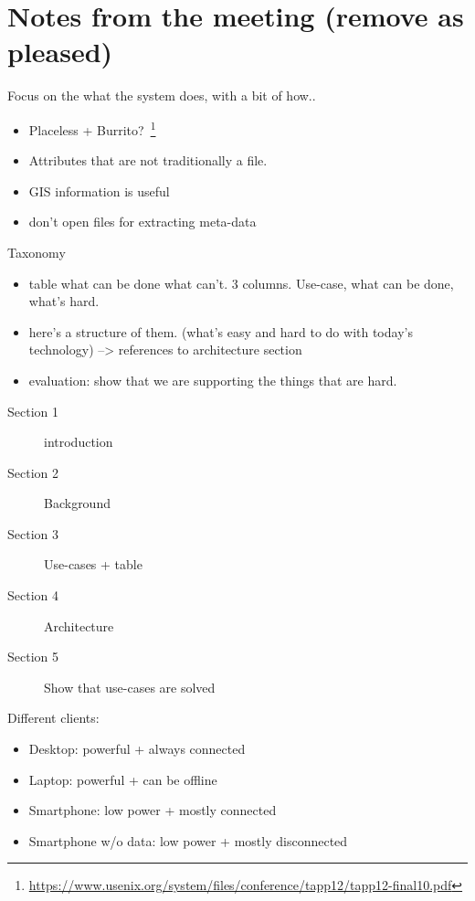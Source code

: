 \section{Notes from the meeting (remove as pleased)}

Focus on the what the system does, with a bit of how..

\begin{itemize}
    \item Placeless + Burrito?~\footnote{\url{https://www.usenix.org/system/files/conference/tapp12/tapp12-final10.pdf}}
    \item Attributes that are not traditionally a file.
    \item GIS information is useful
    \item don't open files for extracting meta-data
\end{itemize}

Taxonomy

\begin{itemize}
 \item table what can be done what can't. 3 columns. Use-case, what can be done, what's hard.
 \item here's a structure of them. (what's easy and hard to do with today's technology) --> references to architecture section
 \item evaluation: show that we are supporting the things that are hard.
\end{itemize}

 \begin{description}
\item[Section 1] introduction
\item[Section 2] Background
\item[Section 3] Use-cases + table
\item[Section 4] Architecture
\item[Section 5] Show that use-cases are solved
 \end{description}

Different clients:

\begin{itemize}
 \item Desktop: powerful + always connected
 \item Laptop: powerful + can be offline
 \item Smartphone: low power + mostly connected
 \item Smartphone w/o data: low power + mostly disconnected
\end{itemize}
